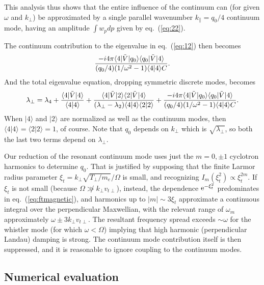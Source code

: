 \documentclass[12pt]{article}
\def\ket#1{|#1\rangle}
\def\bra#1{\langle#1}
\def\etothe#1{{\rm e}^{#1}}
\begin{document}
This analysis thus shows that the entire influence of the continuum
can (for given $\omega$ and $k_\perp$) be approximated by a single
parallel wavenumber $k_\parallel= q_{0}/4$ continuum mode, having an
amplitude $\int w_p dp$ given by eq.\ (\ref{eq:22}).

The continuum contribution to the eigenvalue in eq.\ (\ref{eq:12}) then
becomes
\begin{equation}
  \label{eigcon}
  {-i4\pi\bra{4}|\tilde V \ket{q_{0}}\bra{q_{0}}|\tilde{V}\ket{4}
    \over
    (q_{0}/4)(1/\omega^2-1)\bra{4}\ket{4}C}\iffalse
  =
  {-i4\pi\bra{4}|\tilde V \ket{q_{0}}\bra{q_{0}}|\tilde{V}\ket{4}
    \over
    k_\parallel(1/\omega^2-1)\bra{4}\ket{4}C}\fi.
\end{equation}
And the total eigenvalue equation, dropping symmetric discrete modes, becomes
\begin{equation}
  \label{eigtotal}
  \lambda_\perp=\lambda_4+{\bra{4}|\tilde{V}\ket{4}\over
    \bra{4}\ket{4}}
    +{\bra{4}|\tilde{V}\ket{2}\bra{2}|\tilde{V}\ket{4}\over
      (\lambda_\perp-\lambda_2)\bra{4}\ket{4} \bra{2}\ket{2}}
    +%
    {-i4\pi\bra{4}|\tilde V \ket{q_{0}}\bra{q_{0}}|\tilde{V}\ket{4}
    \over
    (q_{0}/4)(1/\omega^2-1)\bra{4}\ket{4}C}.
\end{equation}
When $\ket{4}$ and $\ket{2}$ are normalized as well as the
continuum modes, then $\bra{4}\ket{4}=\bra{2}\ket{2}=1$, of
course. Note that $q_0$ depends on $k_\perp$ which is
$\sqrt{\lambda_\perp}$, so both the last two terms depend on
$\lambda_\perp$.

Our reduction of the resonant continuum mode uses just the $m=0,\pm 1$
cyclotron harmonics to determine $q_{0}.$ That is justified by
supposing that the finite Larmor radius parameter
$\xi_t=k_\perp\sqrt{T_\perp/m_e}/\Omega$ is small, and recognizing
$I_m(\xi_t^2)\propto \xi_t^{2m}$. If $\xi_t$ is not small (because
$\Omega\not\gg k_\perp v_{t\perp}$), instead, the dependence
$\etothe{-\xi_t^2}$ predominates in eq.\ (\ref{eq:ftmagnetic}), and
harmonics up to $|m|\sim 3\xi_t$ approximate a continuous integral
over the perpendicular Maxwellian, with the relevant range of
$\omega_m$ approximately $\omega\pm 3k_\perp v_{t\perp}$. The
resultant frequency spread exceeds $\sim\omega$ for the whistler mode
(for which $\omega < \Omega$) implying that high harmonic
(perpendicular Landau) damping is strong. The continuum mode
contribution itself is then suppressed, and it is reasonable to ignore
coupling to the continuum modes.

\subsection{Numerical evaluation}
\end{document}
